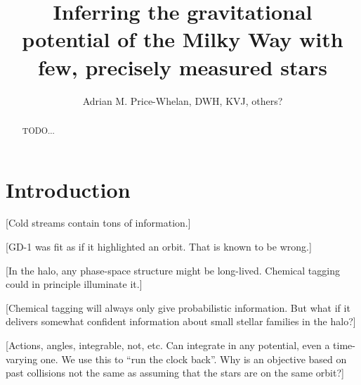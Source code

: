 \documentclass[letterpaper,12pt,preprint]{aastex}
\begin{document}
\title{Inferring the gravitational potential of the Milky Way with few, precisely measured stars}
\author{Adrian M. Price-Whelan, DWH, KVJ, others?}

\begin{abstract}
TODO...
\end{abstract}


\section{Introduction}

[Cold streams contain tons of information.]

[GD-1 was fit as if it highlighted an orbit.  That is known to be
  wrong.]

[In the halo, any phase-space structure might be long-lived.  Chemical
  tagging could in principle illuminate it.]

[Chemical tagging will always only give probabilistic information.
  But what if it delivers somewhat confident information about small
  stellar families in the halo?]

[Actions, angles, integrable, not, etc.  Can integrate in any
  potential, even a time-varying one. We use this to
  ``run the clock back''.  Why is an objective based on past collisions not the
  same as assuming that the stars are on the same orbit?]
\end{document}
